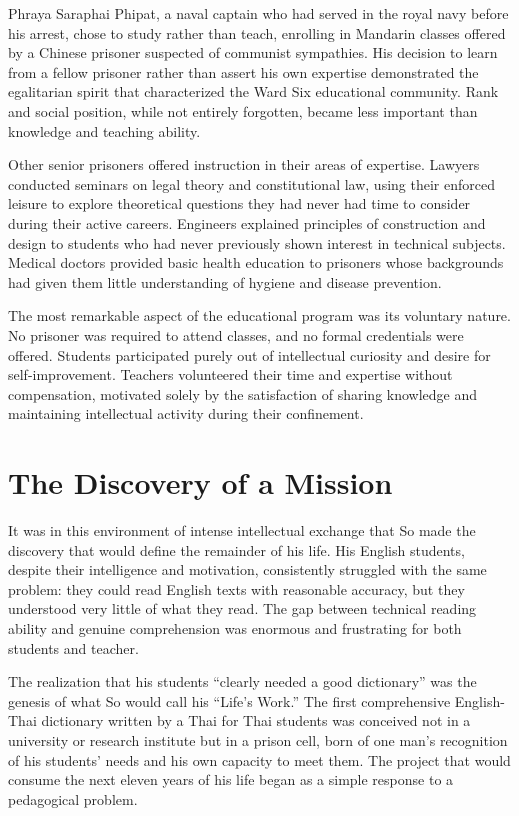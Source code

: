\documentclass[
  Letterpaper,
]{scrbook}
\begin{document}
Phraya Saraphai Phipat, a naval captain who had served in the royal navy
before his arrest, chose to study rather than teach, enrolling in
Mandarin classes offered by a Chinese prisoner suspected of communist
sympathies. His decision to learn from a fellow prisoner rather than
assert his own expertise demonstrated the egalitarian spirit that
characterized the Ward Six educational community. Rank and social
position, while not entirely forgotten, became less important than
knowledge and teaching ability.

Other senior prisoners offered instruction in their areas of expertise.
Lawyers conducted seminars on legal theory and constitutional law, using
their enforced leisure to explore theoretical questions they had never
had time to consider during their active careers. Engineers explained
principles of construction and design to students who had never
previously shown interest in technical subjects. Medical doctors
provided basic health education to prisoners whose backgrounds had given
them little understanding of hygiene and disease prevention.

The most remarkable aspect of the educational program was its voluntary
nature. No prisoner was required to attend classes, and no formal
credentials were offered. Students participated purely out of
intellectual curiosity and desire for self-improvement. Teachers
volunteered their time and expertise without compensation, motivated
solely by the satisfaction of sharing knowledge and maintaining
intellectual activity during their confinement.

\section{The Discovery of a Mission}\label{the-discovery-of-a-mission}

It was in this environment of intense intellectual exchange that So made
the discovery that would define the remainder of his life. His English
students, despite their intelligence and motivation, consistently
struggled with the same problem: they could read English texts with
reasonable accuracy, but they understood very little of what they read.
The gap between technical reading ability and genuine comprehension was
enormous and frustrating for both students and teacher.

The realization that his students ``clearly needed a good dictionary''
was the genesis of what So would call his ``Life's Work.'' The first
comprehensive English-Thai dictionary written by a Thai for Thai
students was conceived not in a university or research institute but in
a prison cell, born of one man's recognition of his students' needs and
his own capacity to meet them. The project that would consume the next
eleven years of his life began as a simple response to a pedagogical
problem.
\end{document}
